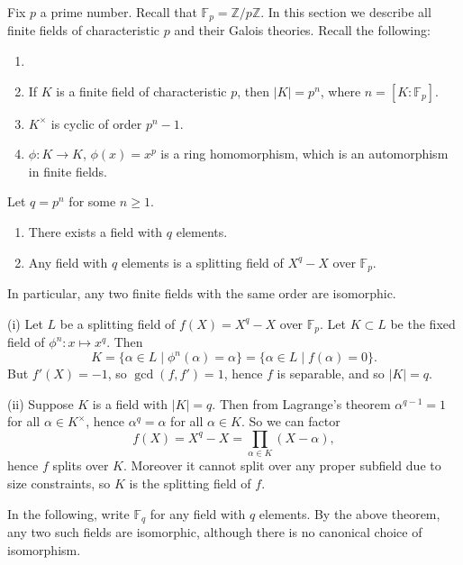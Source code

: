 \documentclass[12pt]{article}
\begin{document}
Fix $p$ a prime number. Recall that $\mathbb{F}_p = \mathbb{Z}/p \mathbb{Z}$. In this section we describe all finite fields of characteristic $p$ and their Galois theories. Recall the following:

\begin{proposition}
	\begin{enumerate}[\normalfont(i)]
		\item[]
		\item If $K$ is a finite field of characteristic $p$, then $|K| = p^{n}$, where $n = [K: \mathbb{F}_p]$.
		\item $K^{\times}$ is cyclic of order $p^{n}-1$.
		\item $\phi : K \to K$, $\phi(x) = x^{p}$ is a ring homomorphism, which is an automorphism in finite fields.
	\end{enumerate}
\end{proposition}

\begin{theorem}
	Let $q = p^{n}$ for some $n \geq 1$.
	\begin{enumerate}[\normalfont(i)]
		\item There exists a field with $q$ elements.
		\item Any field with $q$ elements is a splitting field of $X^q-X$ over $\mathbb{F}_p$.
	\end{enumerate}
	In particular, any two finite fields with the same order are isomorphic.
\end{theorem}

\begin{proofbox}


	(i) Let $L$ be a splitting field of $f(X) = X^q - X$ over $\mathbb{F}_p$. Let $K \subset L$ be the fixed field of $\phi^n : x \mapsto x^q$. Then
	\[
		K = \{\alpha \in L \mid \phi^n(\alpha) = \alpha\} = \{\alpha \in L \mid f(\alpha) = 0\}.
	\]
	But $f'(X) = -1$, so $\gcd(f, f') = 1$, hence $f$ is separable, and so $|K| = q$.

	(ii) Suppose $K$ is a field with $|K| = q$. Then from Lagrange's theorem $\alpha^{q-1} = 1$ for all $\alpha \in K^{\times}$, hence $\alpha^q = \alpha$ for all $\alpha \in K$. So we can factor
	\[
	f(X) = X^q - X = \prod_{\alpha \in K}(X - \alpha),
	\]
	hence $f$ splits over $K$. Moreover it cannot split over any proper subfield due to size constraints, so $K$ is the splitting field of $f$.
\end{proofbox}

In the following, write $\mathbb{F}_q$ for any field with $q$ elements. By the above theorem, any two such fields are isomorphic, although there is no canonical choice of isomorphism.
\end{document}
